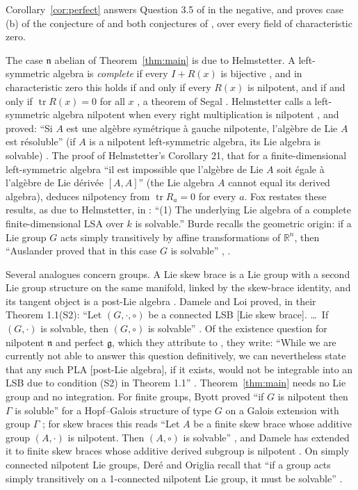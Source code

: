 \documentclass[11pt]{article}
\theoremstyle{definition}
\theoremstyle{remark}
\newcommand{\g}{\mathfrak{g}}
\newcommand{\n}{\mathfrak{n}}
\DeclareMathOperator{\tr}{tr}
\begin{document}
Corollary~\ref{cor:perfect} answers Question 3.5 of \cite{BD} in the
negative, and proves case (b) of the conjecture of \cite{BDM} and both
conjectures of \cite[p.~2689]{OWR}, over every field of characteristic
zero.

The case $\n$ abelian of Theorem~\ref{thm:main} is due to Helmstetter. A
left-symmetric algebra is \emph{complete} if every $I+R(x)$ is bijective
\cite[Definition 3.30]{Bu}, and in characteristic zero this holds if and
only if every $R(x)$ is nilpotent, and if and only if $\tr R(x)=0$ for
all $x$ \cite[Theorem 3.31]{Bu}, a theorem of Segal \cite{Se}. Helmstetter
calls a left-symmetric algebra nilpotent when every right multiplication
is nilpotent \cite[Definition 17]{He}, and proved: ``Si $A$ est une
alg\`ebre sym\'etrique \`a gauche nilpotente, l'alg\`ebre de Lie $A$ est
r\'esoluble'' (if $A$ is a nilpotent left-symmetric algebra, its Lie
algebra is solvable) \cite[Proposition 20]{He}. The proof of
Helmstetter's Corollary 21, that for a finite-dimensional left-symmetric algebra ``il
est impossible que l'alg\`ebre de Lie $A$ soit \'egale \`a l'alg\`ebre de
Lie d\'eriv\'ee $[A,A]$'' (the Lie algebra $A$ cannot equal its derived
algebra), deduces nilpotency from $\tr R_a=0$ for every $a$. Fox restates
these results, as due to Helmstetter, in \cite[Lemma 5.3]{Fo}: ``(1) The
underlying Lie algebra of a complete finite-dimensional LSA over $k$ is
solvable.'' Burde recalls the geometric origin: if a Lie group $G$ acts
simply transitively by affine transformations of $\mathbb{R}^n$, then
``Auslander proved that in this case $G$ is solvable'' \cite{Au},
\cite[Remark 2.28]{Bu}.

Several analogues concern groups. A Lie skew brace is a Lie group with a
second Lie group structure on the same manifold, linked by the skew-brace
identity, and its tangent object is a post-Lie algebra \cite[\S1]{DL}.
Damele and Loi proved, in their Theorem 1.1(S2): ``Let $(G,\cdot,\circ)$
be a connected LSB [Lie skew brace]. \dots\ If $(G,\cdot)$ is solvable,
then $(G,\circ)$ is solvable'' \cite{DL}. Of the existence question for
nilpotent $\n$ and perfect $\g$, which they attribute to \cite{BDM}, they
write: ``While we are currently not able to answer this question
definitively, we can nevertheless state that any such PLA [post-Lie
algebra], if it exists, would not be integrable into an LSB due to
condition (S2) in Theorem 1.1'' \cite[\S1]{DL}. Theorem~\ref{thm:main}
needs no Lie group and no integration. For finite groups, Byott proved
``if $G$ is nilpotent then $\Gamma$ is soluble'' for a Hopf--Galois
structure of type $G$ on a Galois extension with group $\Gamma$
\cite[Theorem 1]{By}; for skew braces this reads ``Let $A$ be a finite
skew brace whose additive group $(A,\cdot)$ is nilpotent. Then $(A,\circ)$
is solvable'' \cite[Corollary 1.23]{SV}, and Damele has extended it to
finite skew braces whose additive derived subgroup is nilpotent \cite{Da}.
On simply connected nilpotent Lie groups, Der\'e and Origlia recall that
``if a group acts simply transitively on a 1-connected nilpotent Lie group,
it must be solvable'' \cite[\S1]{DO}.
\end{document}
